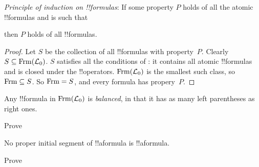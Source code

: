 \documentclass[../../../include/open-logic-section]{subfiles}
\begin{document}


\begin{thm} 
\emph{Principle of induction on !!{formula}s}: If some
  property $P$ holds of all the atomic !!{formula}s and is such
  that
  \begin{enumerate}
  \end{enumerate}
  then $P$ holds of all !!{formula}s.
\end{thm}

\begin{proof}
  Let $S$ be the collection of all !!{formula}s with
  property~$P$. Clearly $S \subseteq \Frm[L_0]$. $S$ satisfies all the
  conditions of : it contains all atomic
  !!{formula}s and is closed under the !!{operator}s.  $\Frm[L_0]$ is
  the smallest such class, so $\Frm \subseteq S$. So $\Frm = S$, and
  every formula has propery~$P$.
\end{proof}

\begin{prop}
   Any !!{formula} in $\Frm[L_0]$ is \emph{balanced}, in that it has
   as many left parentheses as right ones.
\end{prop}

\begin{prob} 
Prove 
\end{prob}

\begin{prop} 
No proper initial segment of !!a{formula} is !!a{formula}.
\end{prop}

\begin{prob}
  Prove 
\end{prob}
\end{document}
